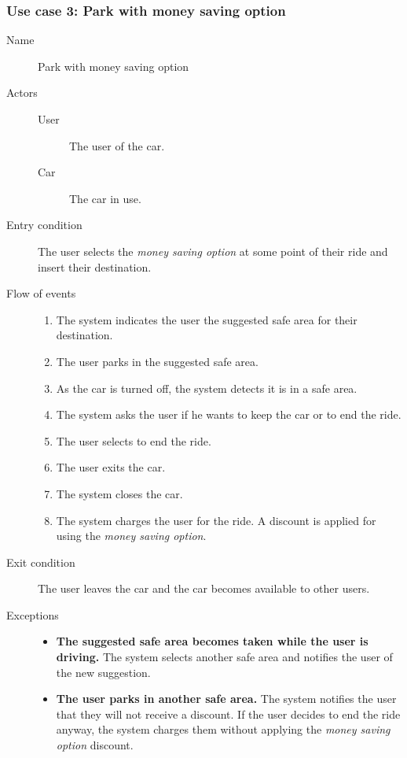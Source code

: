 	\subsubsection{Use case 3: Park with money saving option}
		\begin{description}
			\item[Name] Park with money saving option
			\item[Actors] \hfill
			\begin{description}
				\item[User] The user of the car.
				\item[Car] The car in use.
			\end{description}
			\item[Entry condition] The user selects the \textit{money saving option} at some point of their ride and insert their destination.
			\item[Flow of events] \hfill
			\begin{enumerate}
				\item The system indicates the user the suggested safe area for their destination.
				\item The user parks in the suggested safe area.
				\item As the car is turned off, the system detects it is in a safe area.
				\item The system asks the user if he wants to keep the car or to end the ride.
				\item The user selects to end the ride.
				\item The user exits the car.
				\item The system closes the car.
				\item The system charges the user for the ride. A discount is applied for using the \textit{money saving option}.
			\end{enumerate}
			\item[Exit condition] The user leaves the car and the car becomes available to other users.
			\item[Exceptions] \hfill
			\begin{itemize}
				\item \textbf{The suggested safe area becomes taken while the user is driving.} The system selects another safe area and notifies the user of the new suggestion.
				\item \textbf{The user parks in another safe area.} The system notifies the user that they will not receive a discount. If the user decides to end the ride anyway, the system charges them without applying the \textit{money saving option} discount.

\end{itemize}
\end{description}
